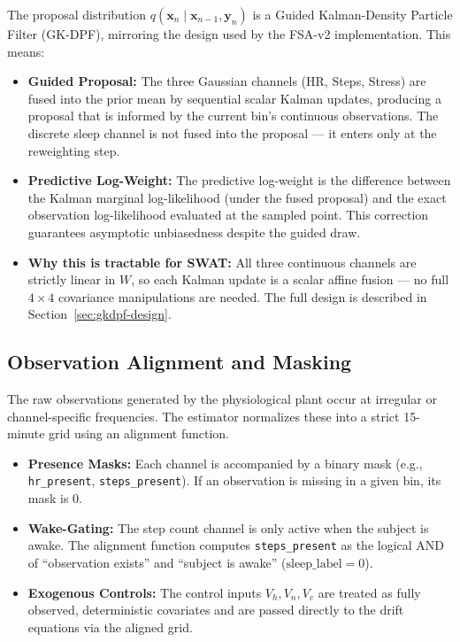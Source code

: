 \documentclass[11pt,a4paper]{article}
\begin{document}
The proposal distribution $q(\mathbf{x}_n \mid \mathbf{x}_{n-1}, \mathbf{y}_n)$ is a Guided Kalman-Density Particle Filter (GK-DPF), mirroring the design used by the FSA-v2 implementation. This means:
\begin{itemize}
    \item \textbf{Guided Proposal:} The three Gaussian channels (HR, Steps, Stress) are fused into the prior mean by sequential scalar Kalman updates, producing a proposal that is informed by the current bin's continuous observations. The discrete sleep channel is not fused into the proposal --- it enters only at the reweighting step.
    \item \textbf{Predictive Log-Weight:} The predictive log-weight is the difference between the Kalman marginal log-likelihood (under the fused proposal) and the exact observation log-likelihood evaluated at the sampled point. This correction guarantees asymptotic unbiasedness despite the guided draw.
    \item \textbf{Why this is tractable for SWAT:} All three continuous channels are strictly linear in $W$, so each Kalman update is a scalar affine fusion --- no full $4\times 4$ covariance manipulations are needed. The full design is described in Section~\ref{sec:gkdpf-design}.
\end{itemize}

\subsection{Observation Alignment and Masking}
The raw observations generated by the physiological plant occur at irregular or channel-specific frequencies. The estimator normalizes these into a strict 15-minute grid using an alignment function. 
\begin{itemize}
    \item \textbf{Presence Masks:} Each channel is accompanied by a binary mask (e.g., \texttt{hr\_present}, \texttt{steps\_present}). If an observation is missing in a given bin, its mask is 0.
    \item \textbf{Wake-Gating:} The step count channel is only active when the subject is awake. The alignment function computes \texttt{steps\_present} as the logical AND of ``observation exists'' and ``subject is awake'' ($\text{sleep\_label} = 0$).
    \item \textbf{Exogenous Controls:} The control inputs $V_h, V_n, V_c$ are treated as fully observed, deterministic covariates and are passed directly to the drift equations via the aligned grid.
\end{itemize}
\end{document}
